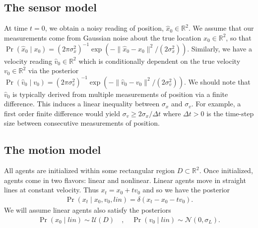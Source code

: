 \documentclass[conference]{IEEEtran}
\begin{document}
\subsection{The sensor model}
At time $t=0$, we obtain a noisy reading of position, $\hat{x}_0 \in \mathbb{R}^2$.
We assume that our measurements come from Gaussian noise about the true location $x_0 \in \mathbb{R}^2$,
so that $\Pr(\hat{x}_0 \mid x_0 ) = (2\pi \sigma_x^2)^{-1} \exp( - \| \hat{x}_0 - x_0 \|^2 / (2 \sigma_x^2) )$.
Similarly, we have a velocity reading $\hat{v}_0 \in \mathbb{R}^2$ which is conditionally dependent on the true velocity $v_0 \in \mathbb{R}^2$
via the posterior $\Pr( \hat{v}_0 \mid v_0 ) = (2\pi \sigma_v^2)^{-1} \exp( - \| \hat{v}_0 - v_0 \|^2 / (2 \sigma_v^2) )$.
We should note that $\hat{v}_0$ is typically derived from multiple measurements of position via a finite difference.
This induces a linear inequality between $\sigma_x$ and $\sigma_v$.
For example, a first order finite difference would yield $\sigma_v \geq 2 \sigma_x / \Delta t$ where $\Delta t > 0$ is the time-step size between consecutive measurements of position.

\subsection{The motion model}
All agents are initialized within some rectangular region $D \subset \mathbb{R}^2$.
Once initialized, agents come in two flavors: linear and nonlinear.
Linear agents move in straight lines at constant velocity.
Thus $x_t = x_0 + t v_0$ and so we have the posterior
\begin{align*}
	\Pr( x_t \mid x_0, v_0, lin) = \delta( x_t - x_0 - t v_0 ).
\end{align*}
We will assume linear agents also satisfy the posteriors
\begin{align*}
	\Pr( x_0 \mid lin ) \sim \mathcal{U}( D)\quad,\quad \Pr( v_0 \mid lin ) \sim \mathcal{N}( 0 , \sigma_L).
\end{align*}
\end{document}
